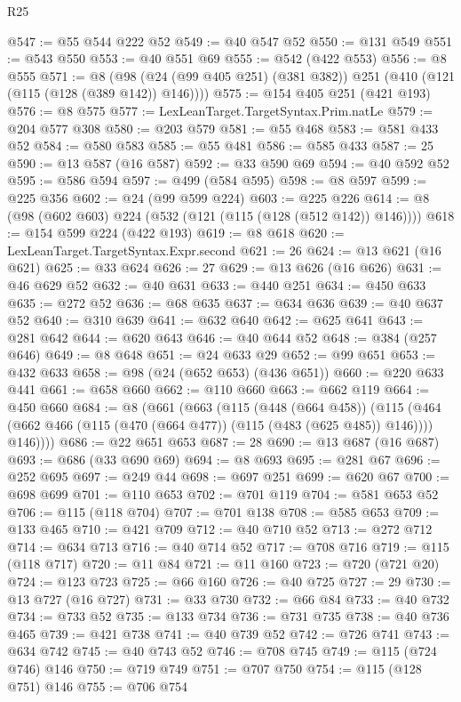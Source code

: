 \begin{lexlean}{R25}
\begin{coremodule}
{{{{{{{{{{{{{{{{{{{{{{{{{{{{{{{{{{{{{{{{{{{{{{{{{{{{{@547 := @55 @544 @222 @52
@549 := @40 @547 @52
@550 := @131 @549
@551 := @543 @550
@553 := @40 @551 @69
@555 := @542 (@422 @553)
@556 := @8 @555
@571 := @8 (@98 (@24 (@99 @405 @251) (@381 @382)) @251 (@410 (@121 (@115 (@128 (@389 @142)) @146))))
@575 := @154 @405 @251 (@421 @193)
@576 := @8 @575
@577 := LexLeanTarget.TargetSyntax.Prim.natLe
@579 := @204 @577 @308
@580 := @203 @579
@581 := @55 @468
@583 := @581 @433 @52
@584 := @580 @583
@585 := @55 @481
@586 := @585 @433
@587 := 25
@590 := @13 @587 (@16 @587)
@592 := @33 @590 @69
@594 := @40 @592 @52
@595 := @586 @594
@597 := @499 (@584 @595)
@598 := @8 @597
@599 := @225 @356
@602 := @24 (@99 @599 @224)
@603 := @225 @226
@614 := @8 (@98 (@602 @603) @224 (@532 (@121 (@115 (@128 (@512 @142)) @146))))
@618 := @154 @599 @224 (@422 @193)
@619 := @8 @618
@620 := LexLeanTarget.TargetSyntax.Expr.second
@621 := 26
@624 := @13 @621 (@16 @621)
@625 := @33 @624
@626 := 27
@629 := @13 @626 (@16 @626)
@631 := @46 @629 @52
@632 := @40 @631
@633 := @440 @251
@634 := @450 @633
@635 := @272 @52
@636 := @68 @635
@637 := @634 @636
@639 := @40 @637 @52
@640 := @310 @639
@641 := @632 @640
@642 := @625 @641
@643 := @281 @642
@644 := @620 @643
@646 := @40 @644 @52
@648 := @384 (@257 @646)
@649 := @8 @648
@651 := @24 @633 @29
@652 := @99 @651
@653 := @432 @633
@658 := @98 (@24 (@652 @653) (@436 @651))
@660 := @220 @633 @441
@661 := @658 @660
@662 := @110 @660
@663 := @662 @119
@664 := @450 @660
@684 := @8
    (@661
      (@663
        (@115
          (@448 (@664 @458))
          (@115 (@464 (@662 @466 (@115 (@470 (@664 @477)) (@115 (@483 (@625 @485)) @146)))) @146))))
@686 := @22 @651 @653
@687 := 28
@690 := @13 @687 (@16 @687)
@693 := @686 (@33 @690 @69)
@694 := @8 @693
@695 := @281 @67
@696 := @252 @695
@697 := @249 @44
@698 := @697 @251
@699 := @620 @67
@700 := @698 @699
@701 := @110 @653
@702 := @701 @119
@704 := @581 @653 @52
@706 := @115 (@118 @704)
@707 := @701 @138
@708 := @585 @653
@709 := @133 @465
@710 := @421 @709
@712 := @40 @710 @52
@713 := @272 @712
@714 := @634 @713
@716 := @40 @714 @52
@717 := @708 @716
@719 := @115 (@118 @717)
@720 := @11 @84
@721 := @11 @160
@723 := @720 (@721 @20)
@724 := @123 @723
@725 := @66 @160
@726 := @40 @725
@727 := 29
@730 := @13 @727 (@16 @727)
@731 := @33 @730
@732 := @66 @84
@733 := @40 @732
@734 := @733 @52
@735 := @133 @734
@736 := @731 @735
@738 := @40 @736 @465
@739 := @421 @738
@741 := @40 @739 @52
@742 := @726 @741
@743 := @634 @742
@745 := @40 @743 @52
@746 := @708 @745
@749 := @115 (@724 @746) @146
@750 := @719 @749
@751 := @707 @750
@754 := @115 (@128 @751) @146
@755 := @706 @754
}}}}}}}}}}}}}}}}}}}}}}}}}}}}}}}}}}}}}}}}}}}}}}}}}}}}}
\end{coremodule}
\end{lexlean}
